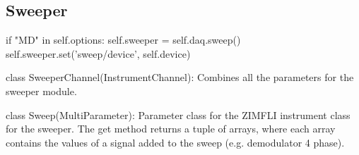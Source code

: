 \documentclass[11pt]{article} %
\begin{document}
\subsection{Sweeper}
        if "MD" in self.options:
            self.sweeper = self.daq.sweep()
            self.sweeper.set('sweep/device', self.device)

class SweeperChannel(InstrumentChannel):
    Combines all the parameters for the sweeper module.

class Sweep(MultiParameter):
    Parameter class for the ZIMFLI instrument class for the sweeper.
    The get method returns a tuple of arrays, where each array contains the
    values of a signal added to the sweep (e.g. demodulator 4 phase).
\end{document}
